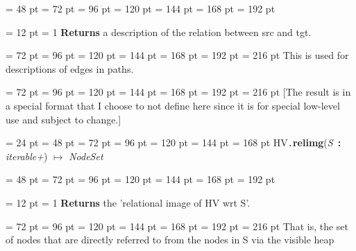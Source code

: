 {{{{{\par}
\par}
{\par \noindent  \leftskip = 48 pt  \leftmargini = 72 pt  \leftmarginii = 96 pt  \leftmarginiii = 120 pt  \leftmarginiv = 144 pt  \leftmarginv = 168 pt  \leftmarginvi = 192 pt {\par \noindent
{\par \pagebreak[3.100000] \noindent \hangindent = 12 pt \hangafter = 1 
{\bf Returns \/} a description of the relation between src and tgt.\par}
{\par \noindent  \leftskip = 72 pt  \leftmargini = 96 pt  \leftmarginii = 120 pt  \leftmarginiii = 144 pt  \leftmarginiv = 168 pt  \leftmarginv = 192 pt  \leftmarginvi = 216 pt  This is used for descriptions of edges in paths.\par}
{\par \noindent  \leftskip = 72 pt  \leftmargini = 96 pt  \leftmarginii = 120 pt  \leftmarginiii = 144 pt  \leftmarginiv = 168 pt  \leftmarginv = 192 pt  \leftmarginvi = 216 pt  {[}The result is in a special format that I choose to not define here
since it is for special low-level use and subject to change.]
\par}
\par}
\par}
\par}
\par}
{\par \noindent  \leftskip = 24 pt  \leftmargini = 48 pt  \leftmarginii = 72 pt  \leftmarginiii = 96 pt  \leftmarginiv = 120 pt  \leftmarginv = 144 pt  \leftmarginvi = 168 pt HV{\tt .\/}{\bf {\large {\bf relimg\/}}\/}({\em S\/}~{\bf :}  {\em iterable+\/}) \(\mapsto \)  {\em NodeSet\/}{\par \noindent
{\par \noindent  \leftskip = 48 pt  \leftmargini = 72 pt  \leftmarginii = 96 pt  \leftmarginiii = 120 pt  \leftmarginiv = 144 pt  \leftmarginv = 168 pt  \leftmarginvi = 192 pt {\par \noindent
{\par \pagebreak[3.100000] \noindent \hangindent = 12 pt \hangafter = 1 
{\bf Returns \/} the 'relational image of HV wrt S'.\par}
{\par \noindent  \leftskip = 72 pt  \leftmargini = 96 pt  \leftmarginii = 120 pt  \leftmarginiii = 144 pt  \leftmarginiv = 168 pt  \leftmarginv = 192 pt  \leftmarginvi = 216 pt  That is, the set of nodes
that are directly referred to from the nodes in S via the visible heap
}}}}}}

